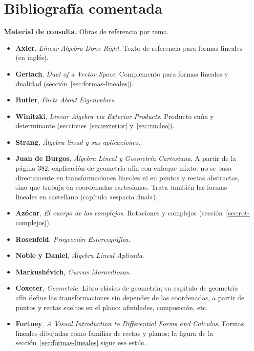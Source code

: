 \section{Bibliografía comentada}\label{cap:bibliografia}\label{ap:bibliografia}

\textbf{Material de consulta.} Obras de referencia por tema.

\begin{itemize}
  \item \textbf{Axler}, \emph{Linear Algebra Done Right}.
  Texto de referencia para formas lineales (en inglés).
  \item \textbf{Gerlach}, \emph{Dual of a Vector Space}.
  Complemento para formas lineales y dualidad (sección~\ref{sec:formas-lineales}).
  \item \textbf{Butler}, \emph{Facts About Eigenvalues}.
  \item \textbf{Winitzki}, \emph{Linear Algebra via Exterior Products}. Producto cuña y determinante
  (secciones~\ref{sec:exterior} y~\ref{sec:nucleo}).
  \item \textbf{Strang}, \emph{Álgebra lineal y sus aplicaciones}.
  \item \textbf{Juan de Burgos}, \emph{Álgebra Lineal y Geometría Cartesiana}. A partir de la página 382, explicación de
  geometría afín con enfoque mixto: no se basa directamente en transformaciones lineales ni en
  puntos y rectas abstractas, sino que trabaja en coordenadas cartesianas. Trata también las
  formas lineales en castellano (capítulo «espacio dual»).
  \item \textbf{Azócar}, \emph{El cuerpo de los complejos}. Rotaciones y complejos
  (sección~\ref{sec:rot-complejos}).
  \item \textbf{Rosenfeld}, \emph{Proyección Estereográfica}.
  \item \textbf{Noble y Daniel}, \emph{Álgebra Lineal Aplicada}.
  \item \textbf{Markushévich}, \emph{Curvas Maravillosas}.
  \item \textbf{Coxeter}, \emph{Geometría}. Libro clásico
  de geometría; su capítulo de geometría afín define las transformaciones sin depender de las
  coordenadas, a partir de puntos y rectas sueltos en el plano: afinidades, composición, etc.
  \item \textbf{Fortney}, \emph{A Visual Introduction to Differential Forms and Calculus}.
  Formas lineales dibujadas como familias de rectas y planos; la figura de la
  sección~\ref{sec:formas-lineales} sigue ese estilo.

\end{itemize}
